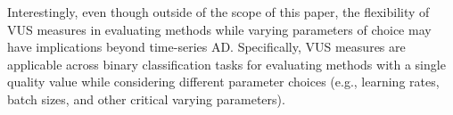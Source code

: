 \begin{table}[tp]
\caption{Analysis of quality measures based on: (i) independence to the number of anomalies; (ii) independence to the threshold; (iii) adaptation to continuous sequences; and (iv) independence to setting parameters.}
\label{methodTable}
\centering
{} %
\end{table}

Interestingly, even though outside of the scope of this paper, the flexibility of VUS measures in evaluating methods while varying parameters of choice may have implications beyond time-series AD. Specifically, VUS measures are applicable across binary classification tasks for evaluating methods with a single quality value while considering different parameter choices (e.g., learning rates, batch sizes, and other critical varying parameters). 

